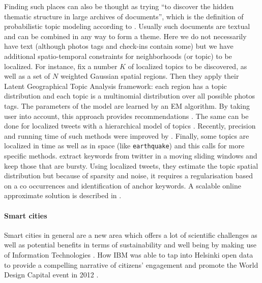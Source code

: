 Finding such places can also be thought as trying \enquote{to discover the
hidden thematic structure in large archives of documents}, which is the
definition of probabilistic topic modeling according to \textcite{topicModel}.
Usually such documents are textual and can be combined in any way to form a
theme. Here we do not necessarily have text (although photos tags and check-ins
contain some) but we have additional spatio-temporal constraints for
neighborhoods (or topic) to be localized. For instance,
\textcite{GeoTopicYin11} fix a number $K$ of localized topics to be discovered,
as well as a set of $N$ weighted Gaussian spatial regions. Then they apply
their Latent Geographical Topic Analysis framework: each region has a topic
distribution and each topic is a multinomial distribution over all possible
photos tags. The parameters of the model are learned by an EM algorithm. By
taking user into account, this approach provides recommendations
\autocite{GeoTopicKurashima2013}. The same can be done for localized tweets
with a hierarchical model of topics \autocite{nestedChinese13}. Recently,
precision and running time of such methods were improved by
\textcite{NonGaussianTopicKling14}. Finally, some topics are localized in time
as well as in space (like \texttt{earthquake}) and this calls for more specific
methods. \Textcite{TwitterBurst13} extract keywords from twitter in a moving
sliding windows and keep those that are bursty. Using localized tweets, they
estimate the topic spatial distribution but because of sparsity and noise, it
requires a regularisation based on a co occurrences and identification of
anchor keywords. A scalable online approximate solution is described in
\autocite{GeoScope}.

\paragraph{Smart cities}

Smart cities in general are a new area which offers a lot of scientific
challenges \autocite[Chapter 4]{Eunoia13} as well as potential benefits in
terms of sustainability and well being by making use of Information
Technologies \autocite{SmartCities13}. How IBM was able to tap into Helsinki
open data to provide a compelling narrative of citizens' engagement and promote
the World Design Capital event in 2012 \autocite{HelsinkiSCC11}.


